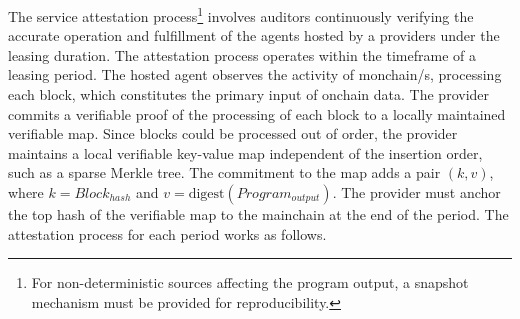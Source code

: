 \documentclass{oc}
\begin{document}
The service attestation process\footnote{
  For non-deterministic sources affecting the program output, a snapshot mechanism must be provided for reproducibility.
} involves \glspl{auditor} continuously verifying the accurate operation and fulfillment of the agents hosted by a \glspl{provider} under the leasing duration.
The attestation process operates within the timeframe of a leasing period.
The hosted \gls{agent} observes the activity of \gls{monchain}/s, processing each block, which constitutes the primary input of onchain data.
The \gls{provider} commits a verifiable proof of the processing of each block to a locally maintained verifiable map.
Since blocks could be processed out of order, the \gls{provider} maintains a local verifiable key-value map independent of the insertion order, such as a sparse Merkle tree\cite{cryptoeprint:2016/683}.
The commitment to the map adds a pair $(k, v)$, where $k=Block_{hash}$ and $v=\text{digest}(Program_{output})$.
The \gls{provider} must anchor the top hash of the verifiable map to the \gls{mainchain} at the end of the period.
The attestation process for each period works as follows.
\end{document}
